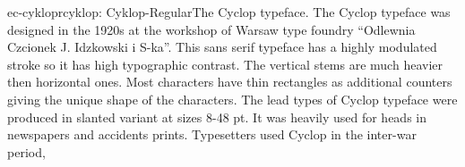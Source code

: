 \documentclass{ddltxtyp}
\begin{document}
\begin{package}{ec-cyklopr}{cyklop: Cyklop-Regular}{The Cyclop typeface.}
The Cyclop typeface was designed in the 1920s at the workshop
of Warsaw type foundry ``Odlewnia Czcionek J. Idzkowski i S-ka''.
This sans serif typeface has a highly modulated stroke so it
has high typographic contrast. The vertical stems are much
heavier then horizontal ones. Most characters have thin
rectangles as additional counters giving the unique shape of
the characters. The lead types of Cyclop typeface were produced
in slanted variant at sizes 8-48 pt. It was heavily used for
heads in newspapers and accidents prints. Typesetters used
Cyclop in the inter-war period, %
\end{package}
\end{document}
